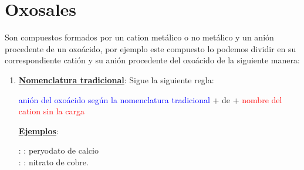 \documentclass[12pt]{article}
\begin{document}
\section{Oxosales}

Son compuestos formados por un cation metálico o no metálico y un anión procedente de un oxoácido, por ejemplo  este compuesto lo podemos dividir en su correspondiente catión  y su anión procedente del oxoácido  de la siguiente manera:
\begin{center}
\end{center}


\begin{enumerate}[label=\numberballblue]
    \item \textbf{\uline{Nomenclatura tradicional}}: Sigue la siguiente regla:
          \begin{center}
              \textcolor{blue}{anión del oxoácido según la nomenclatura tradicional} + de + \textcolor{red}{nombre del cation sin la carga}
          \end{center}

          \textbf{\uline{Ejemplos}}:

           :  : peryodato de calcio \\
           :  : nitrato de cobre.

\end{enumerate}
\end{document}
